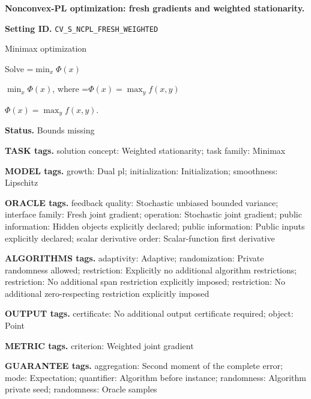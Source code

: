 \documentclass[10pt,a4paper]{article}
\newcommand{\AtlasMath}[1]{\par\begingroup\centering\setbox0=\hbox{$\displaystyle #1$}\ifdim\wd0>1.4\linewidth\typeout{ATLAS WIDE FORMULA: \the\wd0}\fi\ifdim\wd0>\linewidth\resizebox{\linewidth}{!}{\box0}\else\box0\fi\par\endgroup}
\newcommand{\AtlasInlineMath}[1]{\begingroup\setbox0=\hbox{$#1$}\ifdim\wd0>.4\linewidth\endgroup\AtlasMath{#1}\else\endgroup$#1$\fi}
\begin{document}
\raggedright

{\LARGE\bfseries\sffamily\color{AtlasNavy} Nonconvex-PL optimization: fresh gradients and weighted stationarity.\par}\vspace{5pt}


\textbf{Setting ID.} \texttt{CV\_\allowbreak{}S\_\allowbreak{}NCPL\_\allowbreak{}FRESH\_\allowbreak{}WEIGHTED}



Minimax optimization



Solve \AtlasInlineMath{\min_x\Phi(x)}, where \AtlasInlineMath{\Phi(x)=\max_yf(x,y)}.



\textbf{Status.} Bounds missing



\textbf{TASK tags.} solution concept: Weighted stationarity; task family: Minimax



\textbf{MODEL tags.} growth: Dual pl; initialization: Initialization; smoothness: Lipschitz



\textbf{ORACLE tags.} feedback quality: Stochastic unbiased bounded variance; interface family: Fresh joint gradient; operation: Stochastic joint gradient; public information: Hidden objects explicitly declared; public information: Public inputs explicitly declared; scalar derivative order: Scalar-function first derivative



\textbf{ALGORITHMS tags.} adaptivity: Adaptive; randomization: Private randomness allowed; restriction: Explicitly no additional algorithm restrictions; restriction: No additional span restriction explicitly imposed; restriction: No additional zero-respecting restriction explicitly imposed



\textbf{OUTPUT tags.} certificate: No additional output certificate required; object: Point



\textbf{METRIC tags.} criterion: Weighted joint gradient



\textbf{GUARANTEE tags.} aggregation: Second moment of the complete error; mode: Expectation; quantifier: Algorithm before instance; randomness: Algorithm private seed; randomness: Oracle samples
\end{document}
